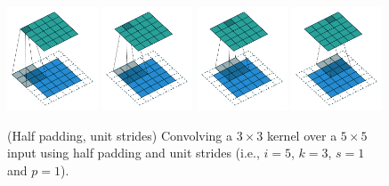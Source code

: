\documentclass[notitlepage]{report}
\begin{document}
\begin{figure}[p]
    \centering
    \includegraphics[width=0.24\textwidth]{pdf/same_padding_no_strides_00.pdf}
    \includegraphics[width=0.24\textwidth]{pdf/same_padding_no_strides_01.pdf}
    \includegraphics[width=0.24\textwidth]{pdf/same_padding_no_strides_02.pdf}
    \includegraphics[width=0.24\textwidth]{pdf/same_padding_no_strides_03.pdf}
    \caption{\label{fig:same_padding_no_strides} (Half padding, unit strides)
        Convolving a $3 \times 3$ kernel over a $5 \times 5$ input using half
        padding and unit strides (i.e., $i = 5$, $k = 3$, $s = 1$ and $p = 1$).}
\end{figure}
\end{document}
